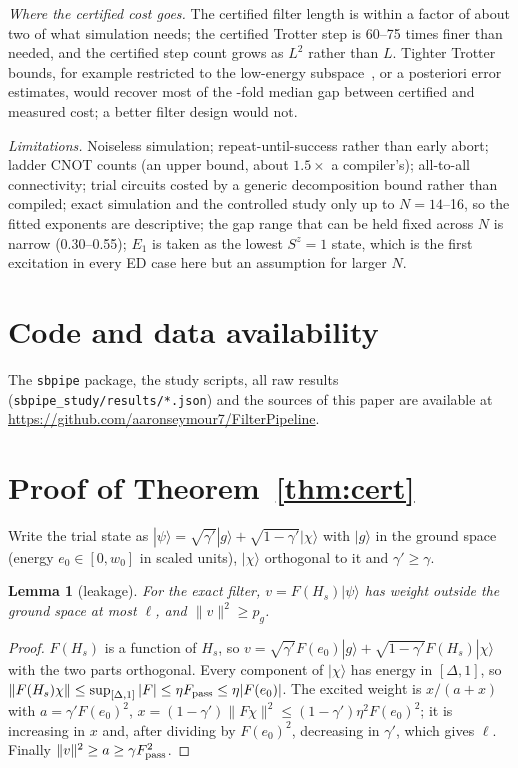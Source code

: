 \documentclass[aps,pra,twocolumn,superscriptaddress,nofootinbib]{revtex4-2}
\newtheorem{lemma}{Lemma}
\newcommand{\ket}[1]{|#1\rangle}
\newcommand{\norm}[1]{\lVert#1\rVert}
\begin{document}
\emph{Where the certified cost goes.} The certified filter length is within a factor of about two of what
simulation needs; the certified Trotter step is 60--75 times finer than needed, and the certified step
count grows as $L^{2}$ rather than $L$. Tighter Trotter bounds, for example restricted to the low-energy
subspace~\cite{Sahinoglu2021}, or a posteriori error estimates, would recover most of the \goCertRatioMed-fold
median gap between certified and measured cost; a better filter design would not.

\emph{Limitations.} Noiseless simulation; repeat-until-success rather than early abort; ladder CNOT counts (an
upper bound, about $1.5\times$ a compiler's); all-to-all connectivity; trial circuits costed by a generic
decomposition bound rather than compiled; exact simulation and the controlled study only up to $N=14$--16, so
the fitted exponents are descriptive; the gap range that can be held fixed across $N$ is narrow
(0.30--0.55); $E_1$ is taken as the lowest $S^z=1$ state, which is the first excitation in every ED case here
but an assumption for larger $N$.

\section*{Code and data availability}
The \texttt{sbpipe} package, the study scripts, all raw results (\texttt{sbpipe\_study/results/*.json}) and
the sources of this paper are available at \url{https://github.com/aaronseymour7/FilterPipeline}.

\appendix

\section{Proof of Theorem~\ref{thm:cert}}
\label{app:proof}

Write the trial state as $\ket\psi=\sqrt{\gamma'}\ket g+\sqrt{1-\gamma'}\ket\chi$ with $\ket g$ in the
ground space (energy $e_0\in[0,w_0]$ in scaled units), $\ket\chi$ orthogonal to it and $\gamma'\ge\gamma$.

\begin{lemma}[leakage]\label{lem:leak}
For the exact filter, $v=F(H_s)\ket\psi$ has weight outside the ground space at most $\ell$, and
$\norm v^2\ge p_g$.
\end{lemma}
\begin{proof}
$F(H_s)$ is a function of $H_s$, so $v=\sqrt{\gamma'}F(e_0)\ket g+\sqrt{1-\gamma'}F(H_s)\ket\chi$ with
the two parts orthogonal. Every component of $\ket\chi$ has energy in $[\Delta,1]$, so
$\norm{F(H_s)\chi}\le\sup_{[\Delta,1]}|F|\le\eta F_{\rm pass}\le\eta|F(e_0)|$. The excited weight is
$x/(a+x)$ with $a=\gamma'F(e_0)^2$, $x=(1-\gamma')\norm{F\chi}^2\le(1-\gamma')\eta^2F(e_0)^2$; it is
increasing in $x$ and, after dividing by $F(e_0)^2$, decreasing in $\gamma'$, which gives $\ell$.
Finally $\norm v^2\ge a\ge\gamma F_{\rm pass}^2$.
\end{proof}
\end{document}
